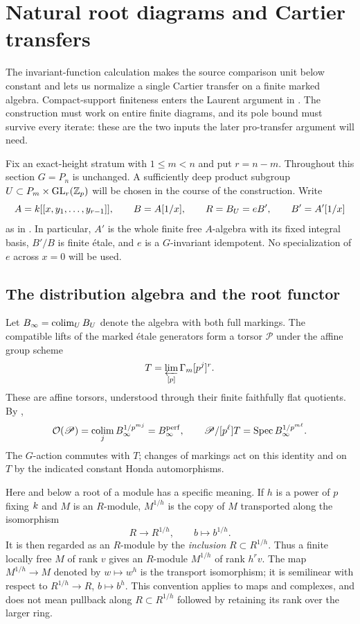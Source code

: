 \section{Natural root diagrams and Cartier transfers}
\label{sec:transfers}

The invariant-function calculation makes the source comparison unit
below constant and lets us normalize a single Cartier transfer on a
finite marked algebra. Compact-support finiteness enters the Laurent
argument in . The construction must work on entire finite
diagrams, and its pole bound must survive every iterate: these are the
two inputs the later pro-transfer argument will need.

Fix an exact-height stratum with $1\leq m<n$ and put $r=n-m$.
Throughout this section $G=P_n$ is unchanged.  A sufficiently deep product
subgroup $U\subset P_m\times\operatorname{GL}_r(\mathbb Z_p)$ will be chosen in the course of the
construction.  Write
\[
 A=k[[x,y_1,\ldots,y_{r-1}]],\qquad B=A[1/x],\qquad
 R=B_U=eB',\qquad B'=A'[1/x]
\]
as in .  In particular, $A'$ is the whole finite
free $A$-algebra with its fixed integral basis, $B'/B$ is finite \'{e}tale,
and $e$ is a $G$-invariant idempotent.  No specialization of $e$ across
$x=0$ will be used.

\subsection{The distribution algebra and the root functor}

Let $B_\infty=\operatorname*{colim}_U B_U$ denote the algebra with both full markings.
The compatible lifts of the marked \'{e}tale generators form a torsor
$\mathscr P$ under the affine group scheme
\[
 T=\varprojlim_{[p]}\Gamma_m[p^j]^r.
\]
These are affine torsors, understood through their finite faithfully flat
quotients.  By ,
\begin{equation}
 \mathcal O(\mathscr P)=\operatorname*{colim}_j B_\infty^{1/p^{mj}}
                 =B_\infty^{\mathrm{perf}},
 \qquad
 \mathscr P/[p^\ell]T=\operatorname{Spec} B_\infty^{1/p^{m\ell}}.
 \label{eq:trans-full-torsor}
\end{equation}
The $G$-action commutes with $T$; changes of markings act on this identity
and on $T$ by the indicated constant Honda automorphisms.

Here and below a root of a module has a specific meaning.  If $h$ is a
power of $p$ fixing $k$ and $M$ is an $R$-module, $M^{1/h}$ is the copy of
$M$ transported along the isomorphism
\[
 R\longrightarrow R^{1/h},\qquad b\longmapsto b^{1/h}.
\]
It is then regarded as an $R$-module by the \emph{inclusion}
$R\subset R^{1/h}$.  Thus a finite locally free $M$ of rank $v$ gives an
$R$-module $M^{1/h}$ of rank $h^rv$.  The map $M^{1/h}\to M$ denoted by
$w\mapsto w^h$ is the transport isomorphism; it is semilinear with respect
to $R^{1/h}\to R$, $b\mapsto b^h$.  This convention applies to maps and
complexes, and does not mean pullback along $R\subset R^{1/h}$ followed
by retaining its rank over the larger ring.


